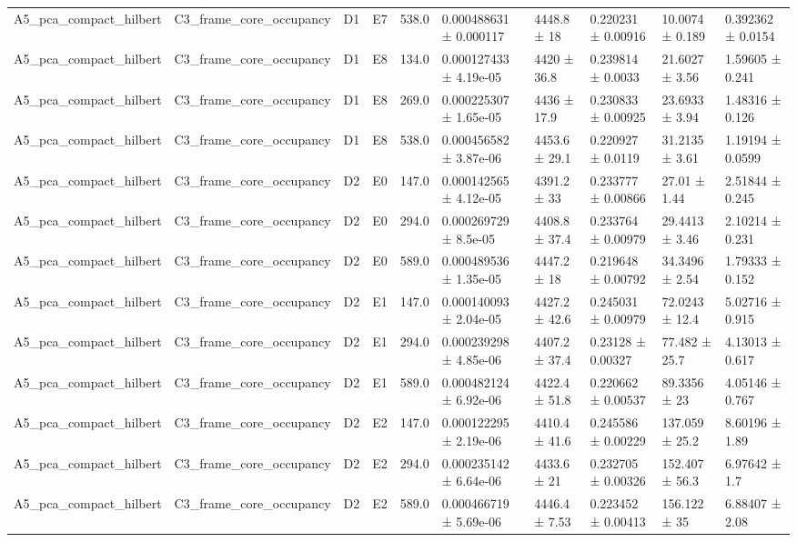 \begin{table}
\begin{tabular}{llllllllll}
A5\_pca\_compact\_hilbert & C3\_frame\_core\_occupancy & D1 & E7 & 538.0 & 0.000488631 ± 0.000117 & 4448.8 ± 18 & 0.220231 ± 0.00916 & 10.0074 ± 0.189 & 0.392362 ± 0.0154 \\
A5\_pca\_compact\_hilbert & C3\_frame\_core\_occupancy & D1 & E8 & 134.0 & 0.000127433 ± 4.19e-05 & 4420 ± 36.8 & 0.239814 ± 0.0033 & 21.6027 ± 3.56 & 1.59605 ± 0.241 \\
A5\_pca\_compact\_hilbert & C3\_frame\_core\_occupancy & D1 & E8 & 269.0 & 0.000225307 ± 1.65e-05 & 4436 ± 17.9 & 0.230833 ± 0.00925 & 23.6933 ± 3.94 & 1.48316 ± 0.126 \\
A5\_pca\_compact\_hilbert & C3\_frame\_core\_occupancy & D1 & E8 & 538.0 & 0.000456582 ± 3.87e-06 & 4453.6 ± 29.1 & 0.220927 ± 0.0119 & 31.2135 ± 3.61 & 1.19194 ± 0.0599 \\
A5\_pca\_compact\_hilbert & C3\_frame\_core\_occupancy & D2 & E0 & 147.0 & 0.000142565 ± 4.12e-05 & 4391.2 ± 33 & 0.233777 ± 0.00866 & 27.01 ± 1.44 & 2.51844 ± 0.245 \\
A5\_pca\_compact\_hilbert & C3\_frame\_core\_occupancy & D2 & E0 & 294.0 & 0.000269729 ± 8.5e-05 & 4408.8 ± 37.4 & 0.233764 ± 0.00979 & 29.4413 ± 3.46 & 2.10214 ± 0.231 \\
A5\_pca\_compact\_hilbert & C3\_frame\_core\_occupancy & D2 & E0 & 589.0 & 0.000489536 ± 1.35e-05 & 4447.2 ± 18 & 0.219648 ± 0.00792 & 34.3496 ± 2.54 & 1.79333 ± 0.152 \\
A5\_pca\_compact\_hilbert & C3\_frame\_core\_occupancy & D2 & E1 & 147.0 & 0.000140093 ± 2.04e-05 & 4427.2 ± 42.6 & 0.245031 ± 0.00979 & 72.0243 ± 12.4 & 5.02716 ± 0.915 \\
A5\_pca\_compact\_hilbert & C3\_frame\_core\_occupancy & D2 & E1 & 294.0 & 0.000239298 ± 4.85e-06 & 4407.2 ± 37.4 & 0.23128 ± 0.00327 & 77.482 ± 25.7 & 4.13013 ± 0.617 \\
A5\_pca\_compact\_hilbert & C3\_frame\_core\_occupancy & D2 & E1 & 589.0 & 0.000482124 ± 6.92e-06 & 4422.4 ± 51.8 & 0.220662 ± 0.00537 & 89.3356 ± 23 & 4.05146 ± 0.767 \\
A5\_pca\_compact\_hilbert & C3\_frame\_core\_occupancy & D2 & E2 & 147.0 & 0.000122295 ± 2.19e-06 & 4410.4 ± 41.6 & 0.245586 ± 0.00229 & 137.059 ± 25.2 & 8.60196 ± 1.89 \\
A5\_pca\_compact\_hilbert & C3\_frame\_core\_occupancy & D2 & E2 & 294.0 & 0.000235142 ± 6.64e-06 & 4433.6 ± 21 & 0.232705 ± 0.00326 & 152.407 ± 56.3 & 6.97642 ± 1.7 \\
A5\_pca\_compact\_hilbert & C3\_frame\_core\_occupancy & D2 & E2 & 589.0 & 0.000466719 ± 5.69e-06 & 4446.4 ± 7.53 & 0.223452 ± 0.00413 & 156.122 ± 35 & 6.88407 ± 2.08 \\

\end{tabular}
\end{table}
